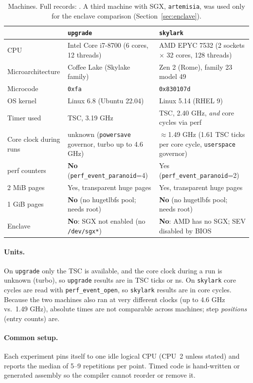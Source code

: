 \documentclass[11pt]{article}
\newcommand{\up}{\texttt{upgrade}}
\newcommand{\sk}{\texttt{skylark}}
\newcommand{\file}[1]{\texttt{\detokenize{#1}}}
\begin{document}
\begin{table}[H]
\centering
\small
\begin{tabularx}{\linewidth}{@{}lXX@{}}
\toprule
 & \up{} & \sk{} \\
\midrule
CPU & Intel Core i7-8700 (6 cores, 12 threads) & AMD EPYC 7532 (2 sockets $\times$ 32 cores, 128 threads) \\
Microarchitecture & Coffee Lake (Skylake family) & Zen 2 (Rome), family 23 model 49 \\
Microcode & \texttt{0xfa} & \texttt{0x830107d} \\
OS kernel & Linux 6.8 (Ubuntu 22.04) & Linux 5.14 (RHEL 9) \\
Timer used & TSC, 3.19 GHz & TSC, 2.40 GHz, \emph{and} core cycles via perf \\
Core clock during runs & unknown (\texttt{powersave} governor, turbo up to 4.6 GHz) & $\approx$1.49 GHz (1.61 TSC ticks per core cycle, \texttt{userspace} governor) \\
perf counters & \textbf{No} (\texttt{perf\_event\_paranoid}=4) & Yes (\texttt{perf\_event\_paranoid}=2) \\
2 MiB pages & Yes, transparent huge pages & Yes, transparent huge pages \\
1 GiB pages & \textbf{No} (no hugetlbfs pool; needs root) & \textbf{No} (no hugetlbfs pool; needs root) \\
Enclave & \textbf{No}: SGX not enabled (no \texttt{/dev/sgx*}) & \textbf{No}: AMD has no SGX; SEV disabled by BIOS \\
\bottomrule
\end{tabularx}
\caption{Machines. Full records: \file{data/<host>/machine_info.txt}. A third
machine with SGX, \texttt{artemisia}, was used only for the enclave
comparison (Section~\ref{sec:enclave}).}
\label{tab:machines}
\end{table}

\paragraph{Units.} On \up{} only the TSC is available, and the core clock
during a run is unknown (turbo), so \up{} results are in TSC ticks or ns.
On \sk{} core cycles are read with \texttt{perf\_event\_open}, so \sk{}
results are in core cycles. Because the two machines also ran at very
different clocks (up to 4.6 GHz vs.\ 1.49 GHz), absolute times are not
comparable across machines; step \emph{positions} (entry counts) are.

\paragraph{Common setup.} Each experiment pins itself to one idle logical
CPU (CPU~2 unless stated) and reports the median of 5--9 repetitions per
point. Timed code is hand-written or generated assembly so the compiler
cannot reorder or remove it.
\end{document}
